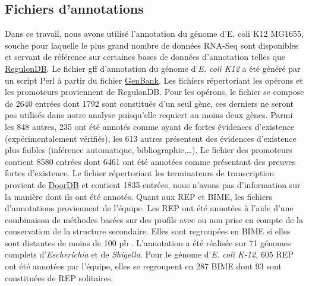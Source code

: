 \documentclass[12pt,a4paper]{report}
\begin{document}
\begin{onehalfspace}
\section*{Fichiers d'annotations}
Dans ce travail, nous avons utilisé l'annotation du génome d'E. coli K12 MG1655, souche pour laquelle le plus grand nombre de données RNA-Seq sont disponibles et servant de référence sur certaines bases de données d'annotation telles que \href{http://regulondb.ccg.unam.mx/}{RegulonDB}.
Le fichier \gls{gff} d'annotation du génome d'\textit{E. coli K12} a été généré par un script Perl à partir du fichier \href{http://www.ncbi.nlm.nih.gov/nuccore/NC_000913.2}{GenBank}. Les fichiers répertoriant les opérons et les promoteurs proviennent de RegulonDB. Pour les opérons, le fichier se compose de 2640 entrées dont 1792 sont constitués d'un seul gène, ces derniers ne  seront pas utilisés dans notre analyse puisqu'elle requiert au moins deux gènes. Parmi les 848 autres, 235 ont été annotés comme ayant de fortes évidences d'existence (expérimentalement vérifiés), les 613 autres présentent des évidences d'existence plus faibles (inférence automatique, bibliographie,\ldots). Le fichier des promoteurs contient 8580 entrées dont 6461 ont été annotées comme présentant des preuves fortes d'existence. Le fichier répertoriant les terminateurs de transcription provient de \href{http://csbl.bmb.uga.edu/DOOR/}{DoorDB} et contient 1835 entrées, nous n'avons pas d'information sur la manière dont ils ont été annotés. Quant aux REP et BIME, les fichiers d'annotations proviennent de l'équipe. Les REP ont été annotées à l'aide d'une combinaison de méthodes basées sur des profils avec ou non prise en compte de la conservation de la structure secondaire. Elles sont regroupées en BIME si elles sont distantes de moins de 100 pb \citep{Weyder2013}. L'annotation a été réalisée sur 71 génomes complets d'\textit{Escherichia} et de \textit{Shigella}. Pour le génome d'\textit{E. coli K-12}, 605 REP ont été annotées par l'équipe, elles se regroupent en 287 BIME dont 93 sont constituées de REP solitaires.


\end{onehalfspace}
\end{document}
